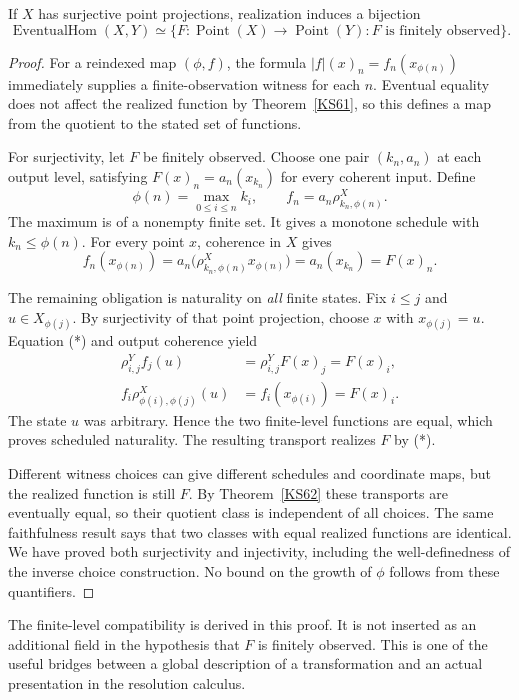 \begin{theorem}\label{KS63}
If \(X\) has surjective point projections, realization induces a bijection
\[
 \operatorname{EventualHom}(X,Y)
 \simeq
 \{F:\operatorname{Point}(X)\to\operatorname{Point}(Y):F
 \text{ is finitely observed}\}.
\]
\end{theorem}
\begin{proof}
For a reindexed map $(\phi,f)$, the formula $|f|(x)_n=f_n(x_{\phi(n)})$ immediately supplies a finite-observation witness for each $n$. Eventual equality does not affect the realized function by Theorem~\ref{KS61}, so this defines a map from the quotient to the stated set of functions.

For surjectivity, let $F$ be finitely observed. Choose one pair $(k_n,a_n)$ at each output level, satisfying $F(x)_n=a_n(x_{k_n})$ for every coherent input. Define
\[
 \phi(n)=\max_{0\le i\le n}k_i,
 \qquad f_n=a_n\rho^X_{k_n,\phi(n)}.
\]
The maximum is of a nonempty finite set. It gives a monotone schedule with $k_n\le\phi(n)$. For every point $x$, coherence in $X$ gives
\[
 f_n(x_{\phi(n)})
 =a_n\bigl(\rho^X_{k_n,\phi(n)}x_{\phi(n)}\bigr)
 =a_n(x_{k_n})=F(x)_n.                                      \tag{*}
\]

The remaining obligation is naturality on \emph{all} finite states. Fix $i\le j$ and $u\in X_{\phi(j)}$. By surjectivity of that point projection, choose $x$ with $x_{\phi(j)}=u$. Equation (*) and output coherence yield
\[
\begin{aligned}
 \rho^Y_{i,j}f_j(u)&=\rho^Y_{i,j}F(x)_j=F(x)_i,\\
 f_i\rho^X_{\phi(i),\phi(j)}(u)&=f_i(x_{\phi(i)})=F(x)_i.
\end{aligned}
\]
The state $u$ was arbitrary. Hence the two finite-level functions are equal, which proves scheduled naturality. The resulting transport realizes $F$ by (*).

Different witness choices can give different schedules and coordinate maps, but the realized function is still $F$. By Theorem~\ref{KS62} these transports are eventually equal, so their quotient class is independent of all choices. The same faithfulness result says that two classes with equal realized functions are identical. We have proved both surjectivity and injectivity, including the well-definedness of the inverse choice construction. No bound on the growth of $\phi$ follows from these quantifiers.
\end{proof}
The finite-level compatibility is derived in this proof. It is not inserted as an additional field in the hypothesis that \(F\) is finitely observed. This is one of the useful bridges between a global description of a transformation and an actual presentation in the resolution calculus.

